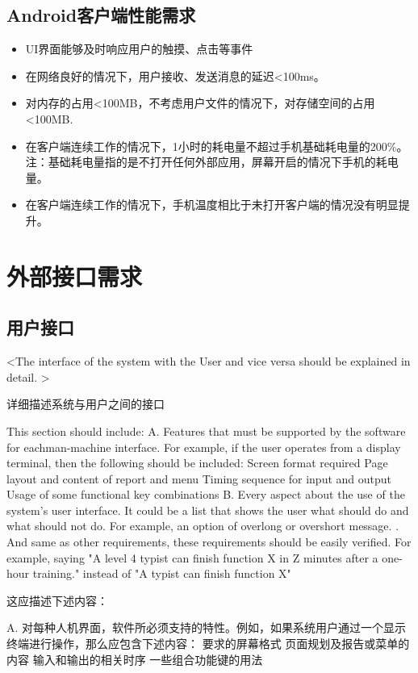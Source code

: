 \subsection{Android客户端性能需求}
\begin{itemize}
	\item UI界面能够及时响应用户的触摸、点击等事件
	\item 在网络良好的情况下，用户接收、发送消息的延迟<100ms。
	\item 对内存的占用<100MB，不考虑用户文件的情况下，对存储空间的占用<100MB.
	\item 在客户端连续工作的情况下，1小时的耗电量不超过手机基础耗电量的200\%。注：基础耗电量指的是不打开任何外部应用，屏幕开启的情况下手机的耗电量。
	\item 在客户端连续工作的情况下，手机温度相比于未打开客户端的情况没有明显提升。
\end{itemize}
\section{外部接口需求}
\subsection{用户接口}
\iffalse
<The interface of the system with the User and vice versa should be explained in detail. >

详细描述系统与用户之间的接口

This section should include:
A. Features that must be supported by the software for eachman-machine interface. For example, if the user operates from a display terminal, then the following should be included:
		Screen format required
		Page layout and content of report and menu
		Timing sequence for input and output
		Usage of some functional key combinations
B. Every aspect about the use of the system's user interface. It could be a list that shows the user what should do and what should not do.  For example, an option of overlong or overshort message. . And same as other requirements, these requirements should be easily verified. For example, saying "A level 4 typist can finish function X in Z minutes after a one-hour training." instead of "A typist can finish function X"	

这应描述下述内容：

A. 对每种人机界面，软件所必须支持的特性。例如，如果系统用户通过一个显示终端进行操作，那么应包含下述内容：
要求的屏幕格式
页面规划及报告或菜单的内容
输入和输出的相关时序
一些组合功能键的用法

